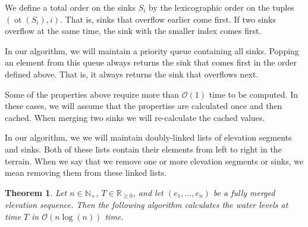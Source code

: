\documentclass[11pt,a4paper]{article}
\newtheorem{thm}{Theorem}
\newcommand{\Np}{\mathbb{N}_+}
\newcommand{\bO}{\mathcal{O}}
\newcommand{\Rnn}{\mathbb{R}_{\ge0}}
\DeclareMathOperator{\ot}{ot}
\begin{document}
We define a total order on the sinks $S_i$ by the lexicographic order on the tuples $(\ot(S_i), i)$.
That is, sinks that overflow earlier come first.
If two sinks overflow at the same time, the sink with the smaller index comes first.

In our algorithm, we will maintain a priority queue containing all sinks.
Popping an element from this queue always returns the sink that comes first in the order defined above.
That is, it always returns the sink that overflows next.

Some of the properties above require more than $\bO(1)$ time to be computed.
In these cases, we will assume that the propertise are calculated once and then cached.
When merging two sinks we will re-calculate the cached values.

In our algorithm, we we will maintain doubly-linked lists of elevation segments and sinks.
Both of these lists contain their elements from left to right in the terrain.
When we say that we remove one or more elevation segments or sinks, we mean removing them from these linked lists.

\begin{thm}
    Let $n\in\Np$, $T\in\Rnn$, and let $(e_1,\ldots,e_n)$ be a fully merged elevation sequence.
    Then the following algorithm calculates the water levels at time $T$ in $\bO(n\log(n))$ time.
\end{thm}

\vspace{1em}
\end{document}
